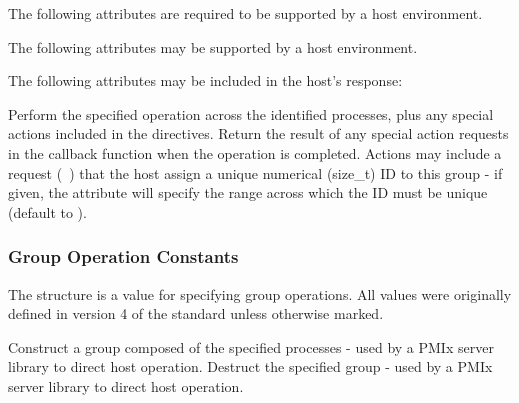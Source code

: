 \reqattrstart
The following attributes are required to be supported by a host environment.

\reqattrend

\optattrstart
The following attributes may be supported by a host environment.



The following attributes may be included in the host's response:


\optattrend

\descr

Perform the specified operation across the identified processes, plus any special actions included in the directives. Return the result of any special action requests in the callback function when the operation is completed. Actions may include a request (~) that the host assign a unique numerical (size_t) ID to this group - if given, the  attribute will specify the range across which the ID must be unique (default to ).

\subsubsection{Group Operation Constants}

The  structure is a  value for specifying group operations. All values were originally defined in version 4 of the standard unless otherwise marked.

\begin{constantdesc}
%
Construct a group composed of the specified processes - used by a \ac{PMIx} server library to direct host operation.
%
Destruct the specified group - used by a \ac{PMIx} server library to direct host operation.
%
\end{constantdesc}


